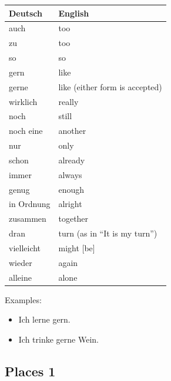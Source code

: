 \begin{center}\begin{tabular}{l|l}
  \textbf{Deutsch} & \textbf{English} \\
	\hline
	auch & too \\
	zu & too \\
	so & so \\
	gern & like \\
	gerne & like (either form is accepted) \\
	wirklich & really \\
	noch & still \\
	noch eine & another \\
	nur & only \\
	schon & already \\
	immer & always \\
	genug & enough \\
	in Ordnung & alright \\
	zusammen & together \\
	dran & turn (as in ``It is my turn'') \\
	vielleicht & might [be] \\
	wieder & again \\
	alleine & alone \\
\end{tabular}\end{center}

Examples:
\begin{itemize}
  \item  Ich lerne gern.
  \item  Ich trinke gerne Wein.
\end{itemize}


\pagebreak
\subsection{Places 1}

